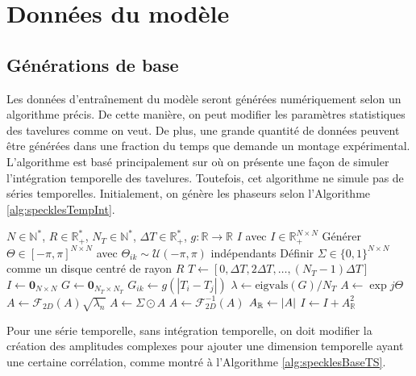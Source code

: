 \documentclass[MSc,french]{ulthese}
\begin{document}
\chapter{Données du modèle}\label{donnees}
\section{Générations de base}
Les données d'entraînement du modèle seront générées numériquement selon un algorithme précis. De cette manière, on peut modifier les paramètres statistiques des tavelures comme on veut. De plus, une grande quantité de données peuvent être générées dans une fraction du temps que demande un montage expérimental. L'algorithme est basé principalement sur \cite{james_simulation_2021} où on présente une façon de simuler l'intégration temporelle des tavelures. Toutefois, cet algorithme ne simule pas de séries temporelles. Initialement, on génère les phaseurs selon l'Algorithme \ref{alg:specklesTempInt}.
\begin{algorithm}
\caption{Simulation de tavelures pleinement développées intégrées temporellement}\label{alg:specklesTempInt}
\begin{algorithmic}
\Require $N\in\mathbb{N}^*$, $R\in\mathbb{R}^{*}_+$, $N_T\in\mathbb{N}^*$, $\Delta T \in \mathbb{R}^*_+$, $g:\mathbb{R}\to\mathbb{R}$
\Ensure $I$ avec $I \in {\mathbb{R}}^{N\times N}_+$
\State Générer $\Theta \in [-\pi,\pi]^{N \times N}$ avec $\Theta_{ik} \sim \mathcal{U}(-\pi,\pi)$ indépendants
\State Définir $\Sigma \in \{0, 1\}^{N\times N}$ comme un disque centré de rayon $R$
\State $T \gets [0, \Delta T, 2\Delta T, \dots, (N_T - 1)\Delta T]$
\State $I \gets \textbf{0}_{N\times N}$
\State $G\gets \textbf{0}_{N_T\times N_T}$
\State $G_{ik} \gets g(|T_i - T_j|)$
\EndFor
\EndFor
\State $\lambda \gets \text{eigvals}(G)/N_T$ 
\State $A \gets \exp{j\Theta}$ 
\State $A \gets \mathcal{F}_{2D}(A)\sqrt{\lambda_n}$
\State $A \gets \Sigma\odot A$
\State $A \gets \mathcal{F}_{2D}^{-1}(A)$
\State $A_{\mathbb{R}} \gets \abs{A}$ 
\State $I \gets I + A_{\mathbb{R}}^2$ 
\EndFor
\end{algorithmic}
\end{algorithm}
\newpage
Pour une série temporelle, sans intégration temporelle, on doit modifier la création des amplitudes complexes pour ajouter une dimension temporelle ayant une certaine corrélation, comme montré à l'Algorithme \ref{alg:specklesBaseTS}.
\end{document}
